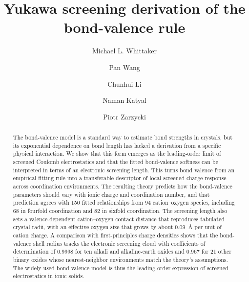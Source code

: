 \documentclass[aps,prmaterials,twocolumn,10pt,superscriptaddress,floatfix]{revtex4-2}
\begin{document}
\title{Yukawa screening derivation of the bond-valence rule}

\author{Michael L. Whittaker}

\author{Pan Wang}

\author{Chunhui Li}

\author{Naman Katyal}

\author{Piotr Zarzycki}

\begin{abstract}
The bond-valence model is a standard way to estimate bond strengths in
crystals, but its exponential dependence on bond length has lacked a
derivation from a specific physical interaction.  We show that this form
emerges as the leading-order limit of screened Coulomb electrostatics
and that the fitted bond-valence softness can be interpreted in terms of
an electronic screening length.  This turns bond valence from an
empirical fitting rule into a transferable descriptor of local screened
charge response across coordination environments.  The resulting theory predicts how the
bond-valence parameters should vary with ionic charge and coordination
number, and that prediction agrees with 150 fitted relationships from 94
cation--oxygen species, including 68 in fourfold coordination and
82 in sixfold coordination.  The screening length also
sets a valence-dependent cation--oxygen contact distance that
reproduces tabulated crystal radii, with an effective oxygen size
that grows by about 0.09~\AA{} per unit of cation charge.  A comparison with
first-principles charge densities shows that the bond-valence shell
radius tracks the electronic screening cloud with coefficients of determination
of 0.9998 for ten alkali and alkaline-earth oxides and 0.967 for 21 other binary oxides
whose nearest-neighbor environments match the theory's assumptions.  The
widely used bond-valence model is thus the leading-order expression of
screened electrostatics in ionic solids.
\end{abstract}
\end{document}
